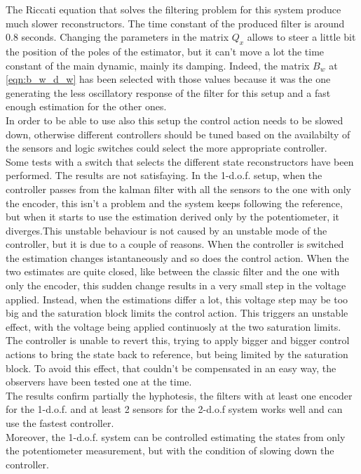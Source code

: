 The Riccati equation that solves the filtering problem for this system produce much slower reconstructors. The time constant of the produced filter is around 0.8 seconds. Changing the parameters in the matrix $Q_x$ allows to steer a little bit the position of the poles of the estimator, but it can't move a lot the time constant of the main dynamic, mainly its damping. Indeed, the matrix $B_w$ at \ref{eqn:b_w_d_w} has been selected with those values because it was the one generating the less oscillatory response of the filter for this setup and a fast enough estimation for the other ones.\\
In order to be able to use also this setup the control action needs to be slowed down, otherwise different controllers should be tuned based on the availabilty of the sensors and logic switches could select the more appropriate controller.\\
Some tests with a switch that selects the different state reconstructors have been performed. The results are not satisfaying. In the 1-d.o.f. setup, when the controller passes from the kalman filter with all the sensors to the one with only the encoder, this isn't a problem and the system keeps following the reference, but when it starts to use the estimation derived only by the potentiometer, it diverges.This unstable behaviour is not caused by an unstable mode of the controller, but it is due to a couple of reasons. When the controller is switched the estimation changes istantaneously and so does the control action. When the two estimates are quite closed, like between the classic filter and the one with only the encoder, this sudden change results in a very small step in the voltage applied. Instead, when the estimations differ a lot, this voltage step may be too big and the saturation block limits the control action. This triggers an unstable effect, with the voltage being applied continuosly at the two saturation limits. The controller is unable to revert this, trying to apply bigger and bigger control actions to bring the state back to reference, but being limited by the saturation block. To avoid this effect, that couldn't be compensated in an easy way, the observers have been tested one at the time. \\
The results confirm partially the hyphotesis, the filters with at least one encoder for the 1-d.o.f. and at least 2 sensors for the 2-d.o.f system works well and can use the fastest controller.\\
Moreover, the 1-d.o.f. system can be controlled estimating the states from only the potentiometer measurement, but with the condition of slowing down the controller.\\
